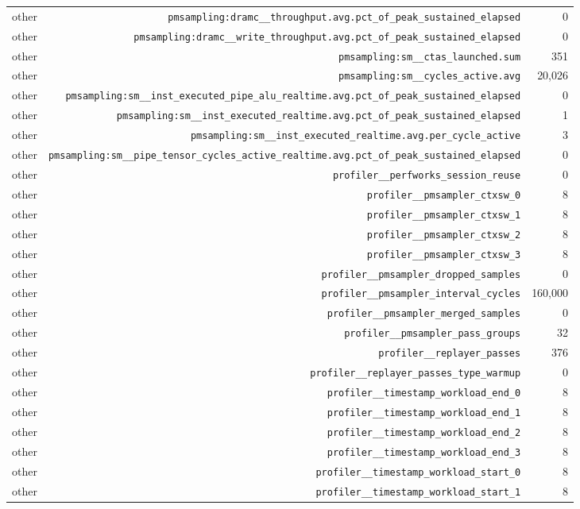 \begin{table}[h]
\begin{tabular}{|l|r|r|}
other & \texttt{pmsampling:dramc__throughput.avg.pct_of_peak_sustained_elapsed} & 0 \\
other & \texttt{pmsampling:dramc__write_throughput.avg.pct_of_peak_sustained_elapsed} & 0 \\
other & \texttt{pmsampling:sm__ctas_launched.sum} & 351 \\
other & \texttt{pmsampling:sm__cycles_active.avg} & 20,026 \\
other & \texttt{pmsampling:sm__inst_executed_pipe_alu_realtime.avg.pct_of_peak_sustained_elapsed} & 0 \\
other & \texttt{pmsampling:sm__inst_executed_realtime.avg.pct_of_peak_sustained_elapsed} & 1 \\
other & \texttt{pmsampling:sm__inst_executed_realtime.avg.per_cycle_active} & 3 \\
other & \texttt{pmsampling:sm__pipe_tensor_cycles_active_realtime.avg.pct_of_peak_sustained_elapsed} & 0 \\
other & \texttt{profiler__perfworks_session_reuse} & 0 \\
other & \texttt{profiler__pmsampler_ctxsw_0} & 8 \\
other & \texttt{profiler__pmsampler_ctxsw_1} & 8 \\
other & \texttt{profiler__pmsampler_ctxsw_2} & 8 \\
other & \texttt{profiler__pmsampler_ctxsw_3} & 8 \\
other & \texttt{profiler__pmsampler_dropped_samples} & 0 \\
other & \texttt{profiler__pmsampler_interval_cycles} & 160,000 \\
other & \texttt{profiler__pmsampler_merged_samples} & 0 \\
other & \texttt{profiler__pmsampler_pass_groups} & 32 \\
other & \texttt{profiler__replayer_passes} & 376 \\
other & \texttt{profiler__replayer_passes_type_warmup} & 0 \\
other & \texttt{profiler__timestamp_workload_end_0} & 8 \\
other & \texttt{profiler__timestamp_workload_end_1} & 8 \\
other & \texttt{profiler__timestamp_workload_end_2} & 8 \\
other & \texttt{profiler__timestamp_workload_end_3} & 8 \\
other & \texttt{profiler__timestamp_workload_start_0} & 8 \\
other & \texttt{profiler__timestamp_workload_start_1} & 8 \\

\end{tabular}
\end{table}
